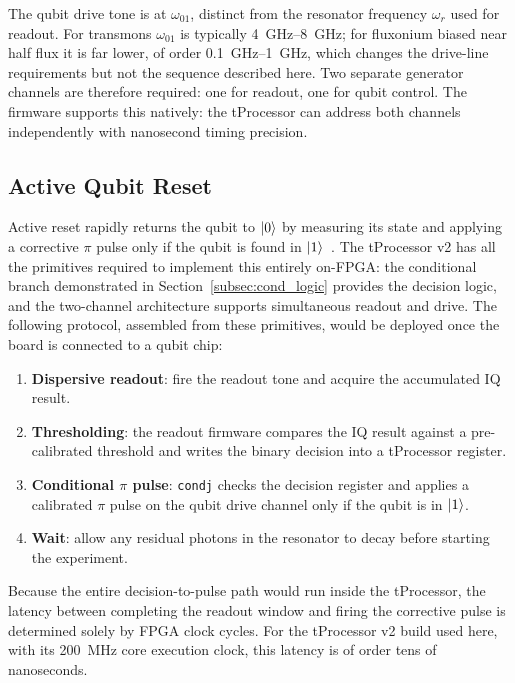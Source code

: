 The qubit drive tone is at $\omega_{01}$, distinct from the resonator frequency
$\omega_r$ used for readout.  For transmons $\omega_{01}$ is typically
\SIrange{4}{8}{\giga\hertz}; for fluxonium biased near half flux it is far lower,
of order \SIrange{0.1}{1}{\giga\hertz}, which changes the drive-line requirements
but not the sequence described here.  Two separate generator channels
are therefore required: one for readout, one for qubit control.  The
\QICK{} firmware supports this natively: the tProcessor can address both channels
independently with nanosecond timing precision.

\subsection{Active Qubit Reset}
\label{subsec:active_reset}

Active reset rapidly returns the qubit to $\ket{0}$ by measuring its state and
applying a corrective $\pi$ pulse only if the qubit is found in $\ket{1}$~\cite{Reed2010}.  The
\QICK{} tProcessor v2 has all the primitives required to implement this entirely
on-FPGA: the conditional branch demonstrated in Section~\ref{subsec:cond_logic}
provides the decision logic, and the two-channel architecture supports
simultaneous readout and drive.  The following protocol, assembled from these
primitives, would be deployed once the board is connected to a qubit chip:
\begin{enumerate}
  \item \textbf{Dispersive readout}: fire the readout tone and acquire the
        accumulated IQ result.
  \item \textbf{Thresholding}: the readout firmware compares the IQ result against
        a pre-calibrated threshold and writes the binary decision into a
        tProcessor register.
  \item \textbf{Conditional $\pi$ pulse}: \texttt{condj} checks the decision
        register and applies a calibrated $\pi$ pulse on the qubit drive channel
        only if the qubit is in $\ket{1}$.
  \item \textbf{Wait}: allow any residual photons in the resonator to decay before
        starting the experiment.
\end{enumerate}

Because the entire decision-to-pulse path would run inside the tProcessor, the
latency between completing the readout window and firing the corrective pulse is
determined solely by FPGA clock cycles.  For the tProcessor v2 build used here,
with its \SI{200}{\mega\hertz} core execution clock, this latency is of order tens
of nanoseconds.

